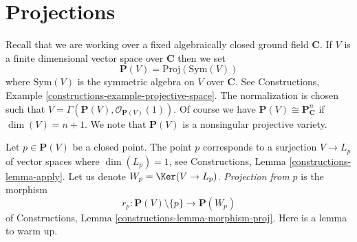 \section{Projections}
\label{section-projection}

\noindent
Recall that we are working over a fixed algebraically closed ground field
$\mathbf{C}$. If $V$ is a finite dimensional vector space over $\mathbf{C}$
then we set
$$
\mathbf{P}(V) = \text{Proj}(\text{Sym}(V))
$$
where $\text{Sym}(V)$ is the symmetric algebra on $V$ over $\mathbf{C}$.
See Constructions, Example \ref{constructions-example-projective-space}.
The normalization is chosen such that
$V = \Gamma(\mathbf{P}(V), \mathcal{O}_{\mathbf{P}(V)}(1))$.
Of course we have $\mathbf{P}(V) \cong \mathbf{P}^n_{\mathbf{C}}$ if
$\dim(V) = n + 1$. We note that $\mathbf{P}(V)$ is a nonsingular projective
variety.

\medskip\noindent
Let $p \in \mathbf{P}(V)$ be a closed point. The point $p$ corresponds to a
surjection $V \to L_p$ of vector spaces where $\dim(L_p) = 1$, see
Constructions, Lemma \ref{constructions-lemma-apply}.
Let us denote $W_p = \Ker(V \to L_p)$.
{\it Projection from $p$} is the morphism
$$
r_p : \mathbf{P}(V) \setminus \{p\} \longrightarrow \mathbf{P}(W_p)
$$
of Constructions, Lemma \ref{constructions-lemma-morphism-proj}.
Here is a lemma to warm up.

